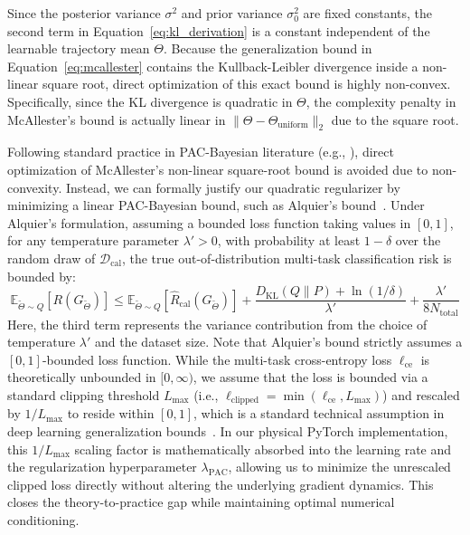 Since the posterior variance $\sigma^2$ and prior variance $\sigma_0^2$ are fixed constants, the second term in Equation~\eqref{eq:kl_derivation} is a constant independent of the learnable trajectory mean $\Theta$. Because the generalization bound in Equation~\eqref{eq:mcallester} contains the Kullback-Leibler divergence inside a non-linear square root, direct optimization of this exact bound is highly non-convex. Specifically, since the KL divergence is quadratic in $\Theta$, the complexity penalty in McAllester's bound is actually linear in $\|\Theta - \Theta_{\text{uniform}}\|_2$ due to the square root.

Following standard practice in PAC-Bayesian literature (e.g., \cite{catoni2007pac, alquier2016properties}), direct optimization of McAllester's non-linear square-root bound is avoided due to non-convexity. Instead, we can formally justify our quadratic regularizer by minimizing a linear PAC-Bayesian bound, such as Alquier's bound~\cite{alquier2016properties}. Under Alquier's formulation, assuming a bounded loss function taking values in $[0, 1]$, for any temperature parameter $\lambda' > 0$, with probability at least $1-\delta$ over the random draw of $\mathcal{D}_{\text{cal}}$, the true out-of-distribution multi-task classification risk is bounded by:
\begin{equation}
\label{eq:alquier}
\mathbb{E}_{\tilde{\Theta} \sim Q}[R(G_{\tilde{\Theta}})] \le \mathbb{E}_{\tilde{\Theta} \sim Q}[\widehat{R}_{\text{cal}}(G_{\tilde{\Theta}})] + \frac{D_{\text{KL}}(Q \parallel P) + \ln(1/\delta)}{\lambda'} + \frac{\lambda'}{8 N_{\text{total}}}
\end{equation}
Here, the third term represents the variance contribution from the choice of temperature $\lambda'$ and the dataset size. Note that Alquier's bound strictly assumes a $[0, 1]$-bounded loss function. While the multi-task cross-entropy loss $\ell_{\text{ce}}$ is theoretically unbounded in $[0, \infty)$, we assume that the loss is bounded via a standard clipping threshold $L_{\max}$ (i.e., $\ell_{\text{clipped}} = \min(\ell_{\text{ce}}, L_{\max})$) and rescaled by $1 / L_{\max}$ to reside within $[0, 1]$, which is a standard technical assumption in deep learning generalization bounds~\cite{guedj2019primer}. In our physical PyTorch implementation, this $1 / L_{\max}$ scaling factor is mathematically absorbed into the learning rate and the regularization hyperparameter $\lambda_{\text{PAC}}$, allowing us to minimize the unrescaled clipped loss directly without altering the underlying gradient dynamics. This closes the theory-to-practice gap while maintaining optimal numerical conditioning.

